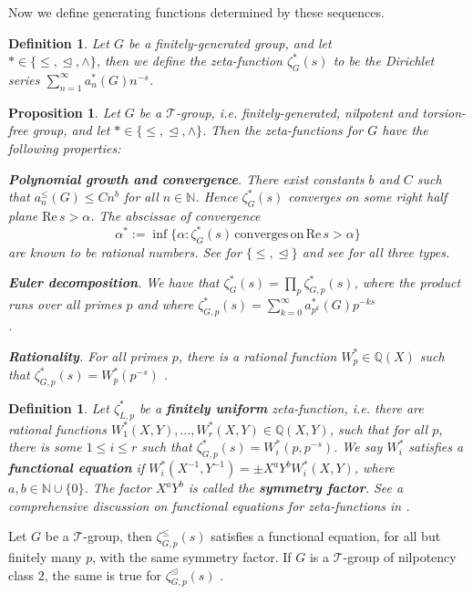 \documentclass[12pt]{article}
\newtheorem{proposition}[theorem]{Proposition}
\newtheorem{definition}[theorem]{Definition}
\begin{document}
Now we define generating functions determined by these sequences. 
\begin{definition}
\label{def:zeta.function}
Let $G$ be a finitely-generated group, and let\\ $\ast\in\{\leq,\trianglelefteq,\wedge\}$, then we define the zeta-function $\zeta_{G}^{\ast}(s)$ to be the Dirichlet series $\sum_{n=1}^{\infty}a_{n}^{\ast}(G){n}^{-s}$. 
\end{definition}
\begin{proposition}
Let $G$ be a $\mathcal{T}$-group, i.e. finitely-generated, nilpotent and torsion-free group, and let $\ast\in\{\leq,\trianglelefteq,\wedge\}$. Then the zeta-functions for $G$ have the following properties:\par
\textbf{Polynomial growth and convergence}. There exist constants $b$ and $C$ such that $a_{n}^{\leq}(G)\leq{C}{n}^{b}$ for all $n\in\mathbb{N}$. Hence $\zeta_{G}^{\ast}(s)$ converges on some right half plane $\mathrm{Re}\,s>\alpha$. The abscissae of convergence \[\alpha^{\ast}:=\inf\{\alpha : \zeta_{G}^{\ast}(s)\,\mathrm{converges}\,\mathrm{on}\,\mathrm{Re}\,s>\alpha\}\] are known to be rational numbers. See \cite[Theorem 1.1]{DuSautoyGrunewald} for $\{\leq,\trianglelefteq\}$ and see \cite[Theorem 7.2]{HrushovskiMartinRideau} for all three types.

\textbf{Euler decomposition}.
We have that $\zeta_{G}^{\ast}(s)=\prod_{p}\zeta_{G,p}^{\ast}(s)$, where the product runs over all primes $p$ and where $\zeta_{G,p}^{\ast}(s)=\sum_{k=0}^{\infty}a_{p^k}^{\ast}(G)p^{-ks}$\\ \cite[Proposition 4]{GrunewaldSegalSmith}.

\textbf{Rationality}. For all primes $p$, there is a rational function $W_{p}^{\ast}\in\mathbb{Q}(X)$ such that $\zeta_{G,p}^{\ast}(s)=W_{p}^{\ast}(p^{-s})$ \cite[Theorem 1]{GrunewaldSegalSmith}.
\end{proposition}
\begin{definition}
Let $\zeta_{L,p}^{\ast}$ be a \textbf{finitely uniform} zeta-function, i.e. there are rational functions $W_{1}^{\ast}(X,Y),\dots,W_{r}^{\ast}(X,Y)\in\mathbb{Q}(X,Y)$, such that for all $p$, there is some $1\leq{i}\leq{r}$ such that $\zeta_{G,p}^{\ast}(s)=W_{i}^{\ast}(p,p^{-s})$. We say $W_{i}^{\ast}$ satisfies a \textbf{functional equation} if $W_{i}^{\ast}(X^{-1},Y^{-1})=\pm{X}^{a}{Y}^{b}{W_{i}^{\ast}(X,Y)}$, where $a,b\in\mathbb{N}\cup\{0\}$. The factor $X^{a}Y^{b}$ is called the \textbf{symmetry factor}. See a comprehensive discussion on functional equations for zeta-functions in \cite{Voll}.
\end{definition}
Let $G$ be a $\mathcal{T}$-group, then $\zeta_{G,p}^{\leq}(s)$ satisfies a functional equation, for all but finitely many $p$, with the same symmetry factor. If $G$ is a $\mathcal{T}$-group of nilpotency class $2$, the same is true for $\zeta_{G,p}^{\trianglelefteq}(s)$ \cite[Theorem C]{Voll}.
\end{document}
